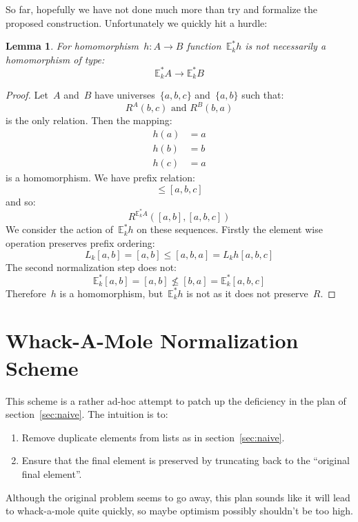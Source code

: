 \documentclass{article}
\theoremstyle{plain}
\newtheorem{lemma}[theorem]{Lemma}
\theoremstyle{definition}
\theoremstyle{remark}
\numberwithin{theorem}{section}
\begin{document}
So far, hopefully we have not done much more than try and formalize the proposed construction. Unfortunately we quickly hit a hurdle:
\begin{lemma}
For homomorphism~$h : A \rightarrow B$ function~$\mathbb{E}^*_k h$ is not necessarily a homomorphism of type:
\begin{equation*}
    \mathbb{E}^*_k A \rightarrow \mathbb{E}^*_k B
\end{equation*}
\end{lemma}
\begin{proof}
Let~$A$ and~$B$ have universes~$\{a,b,c\}$ and~$\{a,b\}$ such that:
\begin{equation*}
    R^A(b,c) \mbox{ and } R^B(b,a)
\end{equation*}
is the only relation. Then the mapping:
\begin{align*}
    h(a) &= a\\
    h(b) &= b\\
    h(c) &= a
\end{align*}
is a homomorphism. We have prefix relation:
\begin{equation*}
    [a,b] \leq [a,b,c]
\end{equation*}
and so:
\begin{equation*}
    R^{\mathbb{E}^*_k A}([a,b], [a,b,c])
\end{equation*}
We consider the action of~$\mathbb{E}^*_k h$ on these sequences. Firstly the element wise operation preserves prefix ordering:
\begin{equation*}
    L_k [a,b] = [a,b] \leq [a,b,a] = L_k h [a,b,c]
\end{equation*}
The second normalization step does not:
\begin{equation*}
    \mathbb{E}^*_k [a,b] = [a,b] \not\leq [b,a] = \mathbb{E}^*_k [a,b,c]
\end{equation*}
Therefore~$h$ is a homomorphism, but~$\mathbb{E}^*_k h$ is not as it does not preserve~$R$.
\end{proof}

\section{Whack-A-Mole Normalization Scheme}
\label{sec:whack-a-mole}
This scheme is a rather ad-hoc attempt to patch up the deficiency in the plan of section~\ref{sec:naive}. The intuition is to:
\begin{enumerate}
    \item Remove duplicate elements from lists as in section~\ref{sec:naive}.
    \item Ensure that the final element is preserved by truncating back to the ``original final element''.
\end{enumerate}
Although the original problem seems to go away, this plan sounds like it will lead to whack-a-mole quite quickly, so maybe optimism possibly shouldn't be too high.
\end{document}
